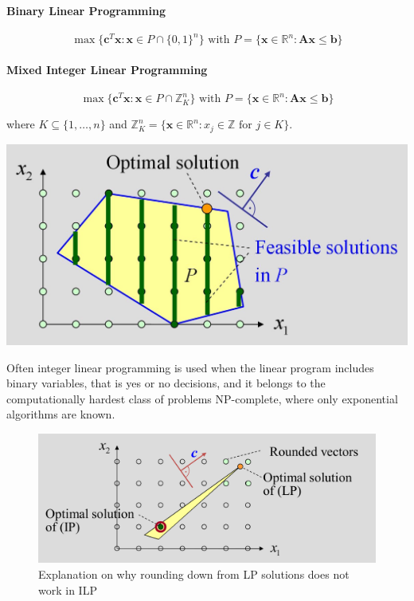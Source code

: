 \documentclass[11pt]{article}
\begin{document}
\paragraph{{\color{red}Binary} Linear Programming}
\begin{equation*}
	\max\{\textbf{c}^T \textbf{x} : \textbf{x} \in P \cap \{0,1\}^n\}\text{ with }P = \{\textbf{x} \in \mathbb{R}^n : \textbf{A}\textbf{x} \leq \textbf{b}\}
\end{equation*}

\paragraph{{\color{red}Mixed Integer} Linear Programming} 
\begin{equation*}
	\max\{\textbf{c}^T \textbf{x} : \textbf{x} \in P \cap \mathbb{Z}_K^n\}\text{ with }P = \{\textbf{x} \in \mathbb{R}^n : \textbf{A}\textbf{x} \leq \textbf{b}\}
\end{equation*}

where $K\subseteq \{1,\dots,n\}$ and $\mathbb{Z}_K^n=\{ \textbf{x}\in\mathbb{R}^n : x_j \in\mathbb{Z}\text{ for } j\in K \}$.

\begin{center}
	\includegraphics[width=0.7\linewidth]{img/mixed_integer_programming}
\end{center}

Often integer linear programming is used when the linear program includes binary variables, that is yes or no decisions, and it belongs to the computationally hardest class of problems NP-complete, where only exponential algorithms are known.

\begin{figure}[tbh]
	\centering
	\includegraphics[width=0.7\linewidth]{img/ilp_rounding_lp}
	\caption{Explanation on why rounding down from LP solutions does not work in ILP}
	\label{fig:ilproundinglp}
\end{figure}
\end{document}
